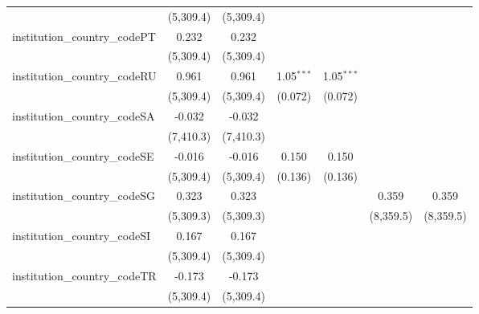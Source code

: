 \begin{tabular}{lcccccc}
                                         & (5,309.4)     & (5,309.4)     &                &                &                &   \\   
   institution\_country\_codePT          & 0.232         & 0.232         &                &                &                &   \\   
                                         & (5,309.4)     & (5,309.4)     &                &                &                &   \\   
   institution\_country\_codeRU          & 0.961         & 0.961         & 1.05$^{***}$   & 1.05$^{***}$   &                &   \\   
                                         & (5,309.4)     & (5,309.4)     & (0.072)        & (0.072)        &                &   \\   
   institution\_country\_codeSA          & -0.032        & -0.032        &                &                &                &   \\   
                                         & (7,410.3)     & (7,410.3)     &                &                &                &   \\   
   institution\_country\_codeSE          & -0.016        & -0.016        & 0.150          & 0.150          &                &   \\   
                                         & (5,309.4)     & (5,309.4)     & (0.136)        & (0.136)        &                &   \\   
   institution\_country\_codeSG          & 0.323         & 0.323         &                &                & 0.359          & 0.359\\   
                                         & (5,309.3)     & (5,309.3)     &                &                & (8,359.5)      & (8,359.5)\\   
   institution\_country\_codeSI          & 0.167         & 0.167         &                &                &                &   \\   
                                         & (5,309.4)     & (5,309.4)     &                &                &                &   \\   
   institution\_country\_codeTR          & -0.173        & -0.173        &                &                &                &   \\   
                                         & (5,309.4)     & (5,309.4)     &                &                &                &   \\   

\end{tabular}
